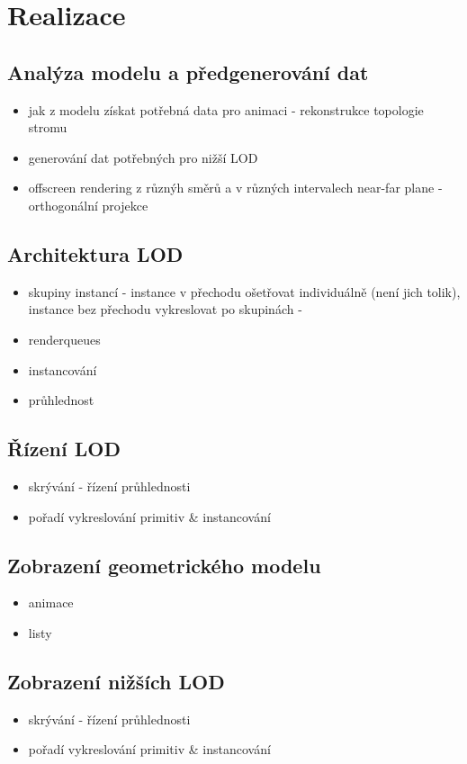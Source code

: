 \chapter{Realizace}
\label{chap:realizace}

\section{Analýza modelu a předgenerování dat}
\label{sec-modelAnalysis}
\begin{itemize}
 \item jak z modelu získat potřebná data pro animaci - rekonstrukce topologie stromu
 \item generování dat potřebných pro nižší LOD
 \item offscreen rendering z různýh směrů a v různých intervalech near-far plane - orthogonální projekce
\end{itemize}

\section{Architektura LOD}
\label{sec-LODarchitecture}

\begin{itemize}
 \item skupiny instancí - instance v přechodu ošetřovat individuálně (není jich tolik), instance bez přechodu  vykreslovat po skupinách - 
\item renderqueues
\item instancování
\item průhlednost
\end{itemize}

\section{Řízení LOD}
\label{sec-LODcontrol}

\begin{itemize}
\item skrývání - řízení průhlednosti
\item pořadí vykreslování primitiv \& instancování
\end{itemize}

\section{Zobrazení geometrického modelu}
\label{sec-3Ddisplay}

\begin{itemize}
\item animace
\item listy
\end{itemize}

\section{Zobrazení nižších LOD}
\label{sec-LODdisplay}

\begin{itemize}
\item skrývání - řízení průhlednosti
\item pořadí vykreslování primitiv \& instancování
\end{itemize}